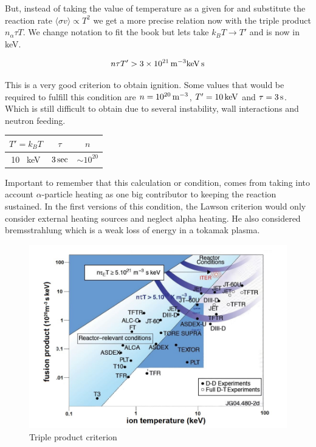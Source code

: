 \documentclass[smallextended]{svjour3}
\begin{document}
But, instead of taking the value of temperature as a given for and substitute the reaction rate $\langle \sigma v\rangle \propto T^2 $ we get a more precise relation now with the triple product $n_{\alpha}\tau T$. We change notation to fit the book but lets take $k_BT \to T'$ and is now in keV.

\begin{equation}
    n\tau T' > 3 \times 10^{21} \, \rm{m}^{-3} \rm{keV} \, \rm{s}
\end{equation}

This is a very good criterion to obtain ignition. Some values that would be required to fulfill this condition are $n = 10^{20} \, \rm{m}^{-3}$, $T' = 10 \, \rm{keV}$ and $\tau = 3 \, \rm{s}$. Which is still difficult to obtain due to several instability, wall interactions and neutron feeding.

\begin{center}
\begin{tabular}{||c||c||c||}
\hline
\textbf{$T' = k_BT$} & \textbf{$\tau$} & \textbf{$n$} \\ \hline
   10 \, \rm{keV} & $3 \, \rm{sec}$  & $\sim 10^{20}$  \\ \hline
\end{tabular}
\end{center}
Important to remember that this calculation or condition, comes from taking into account $\alpha$-particle heating as one big contributor to keeping the reaction sustained. In the first versions of this condition, the Lawson criterion would only consider external heating sources and neglect alpha heating. He also considered bremsstrahlung which is a weak loss of energy in a tokamak plasma.

\begin{figure}[H]
    \centering
    \includegraphics[width=0.8\linewidth]{images/TripleProductCriterion.png}
    \caption{Triple product criterion}
    \label{fig:enter-label}
\end{figure}
\end{document}
